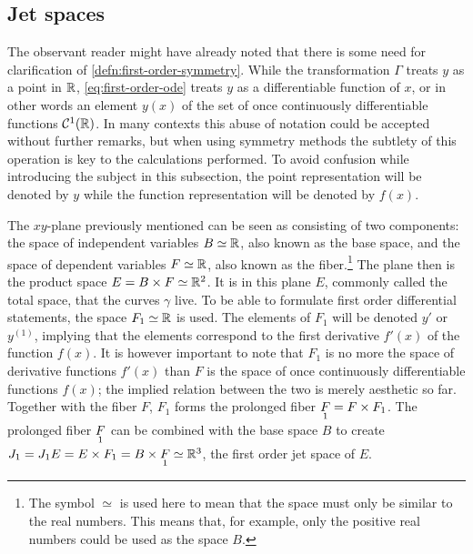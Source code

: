 \subsection{Jet spaces} \label{subsec:jet-spaces}

The observant reader might have already noted that there is some need for clarification of \cref{defn:first-order-symmetry}.
While the transformation \(\Gamma\) treats \(y\) as a point in \(\reals\), \cref{eq:first-order-ode} treats \(y\) as a differentiable function of \(x\), or in other words an element \(y(x)\) of the set of once continuously differentiable functions \(\mathcal{C}^1(\reals)\).
In many contexts this abuse of notation could be accepted without further remarks, but when using symmetry methods the subtlety of this operation is key to the calculations performed.
To avoid confusion while introducing the subject in this subsection, the point representation will be denoted by \(y\) while the function representation will be denoted by \(f(x)\).

The \(xy\)-plane previously mentioned can be seen as consisting of two components: the space of independent variables \(B \simeq \reals\), also known as the base space, and the space of dependent variables \(F \simeq \reals\), also known as the fiber.\footnote{The symbol \(\simeq\) is used here to mean that the space must only be similar to the real numbers. This means that, for example, only the positive real numbers could be used as the space \(B\).}
The plane then is the product space \(E = B \times F \simeq \reals^2\).
It is in this plane \(E\), commonly called the total space, that the curves \(\gamma\) live.
To be able to formulate first order differential statements, the space \(F_1 \simeq \reals\) is used.
The elements of \(F_1\) will be denoted \(y'\) or \(y^{(1)}\), implying that the elements correspond to the first derivative \(f'(x)\) of the function \(f(x)\).
It is however important to note that \(F_1\) is no more the space of derivative functions \(f'(x)\) than \(F\) is the space of once continuously differentiable functions \(f(x)\); the implied relation between the two is merely aesthetic so far.
Together with the fiber \(F\), \(F_1\) forms the prolonged fiber \(\prolong{F}{1} = F \times F_1\).
The prolonged fiber \(\prolong{F}{1}\) can be combined with the base space \(B\) to create \(J_1 = J_1 E = E \times F_1 = B \times \prolong{F}{1} \simeq \reals^3\), the first order jet space of \(E\).

